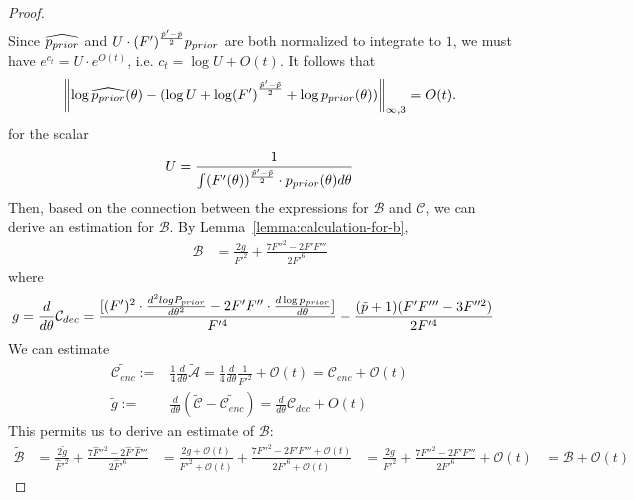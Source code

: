\begin{proof}
\begin{align*}
\end{align*}
Since \(\widehat{p_{prior}}\) and \(U\cdot (F')^{\frac{\tilde{p}'-\tilde{p}}{2}}p_{prior}\) are both normalized to integrate to \(1\), we must have \(e^{c_t}=U\cdot e^{O(t)}\), i.e. \(c_t=\log U + O(t)\). 
It follows that
\begin{equation}
\left\|\log \widehat{p_{prior}}(\theta) - (\log U + \log (F')^{\frac{\tilde{p}'-\tilde{p}}{2}}  + \log p_{prior}(\theta))\right\|_{\infty,3} = O(t).
\end{equation}
for the scalar
\begin{equation}
    U = \frac{1}{\int (F'(\theta))^{\frac{\tilde{p}'-\tilde{p}}{2}} \cdot p_{prior}(\theta) d\theta }
\end{equation}
    Then, based on the connection between the expressions for $\mathcal{B}$ and $\mathcal{C}$, we can derive an estimation for $\mathcal{B}$. By Lemma~\ref{lemma:calculation-for-b},
    \begin{align*}
        \mathcal{B} &= \frac{2g}{F'^2} + \frac{7F''^2-2F'F'''}{2F'^6}
        \end{align*}
        where
        \begin{align*}
        g &= \frac{d}{d\theta} \mathcal{C}_{dec} = \frac{[(F')^2 \cdot \frac{d^2 logP_{prior}}{d \theta^2} - 2F'F'' \cdot \frac{d \log p_{prior}}{d \theta}]}{F'^4} - \frac{(\tilde{p}+1)(F'F''' - 3F''^2)}{2F'^4}
        \end{align*}
We can estimate
\begin{align*}
\tilde{\mathcal{C}_{enc}} := & \frac{1}{4} \frac{d}{d\theta} \tilde{\mathcal{A}} = \frac{1}{4} \frac{d}{d\theta} \frac{1}{F'^2} + \mathcal{O}(t) = \mathcal{C}_{enc} + \mathcal{O}(t)
\\
    \tilde{g} := &\frac{d}{d\theta} \left(\tilde{\mathcal{C}} - \tilde{\mathcal{C}_{enc}}\right) = \frac{d}{d\theta} \mathcal{C}_{dec} + O(t)
\end{align*}
    This permits us to derive an estimate of $\mathcal{B}$:
    \begin{align*}
    \tilde{\mathcal{B}} &= \frac{2\tilde{g}}{\widehat{F}'^2} + \frac{7\widehat{F}''^2 - 2\widehat{F}'\widehat{F}'''}{2\widehat{F}'^6} %
     &= \frac{2g + \mathcal{O}(t)}{F'^2 + \mathcal{O}(t)} + \frac{7F''^2 - 2F'F''' + \mathcal{O}(t)}{2F'^6 + \mathcal{O}(t)} %
     &= \frac{2g}{F'^2} + \frac{7F''^2-2F'F'''}{2F'^6} + \mathcal{O}(t)  %
     &= \mathcal{B} + \mathcal{O}(t) %
\end{align*}

\end{proof}
